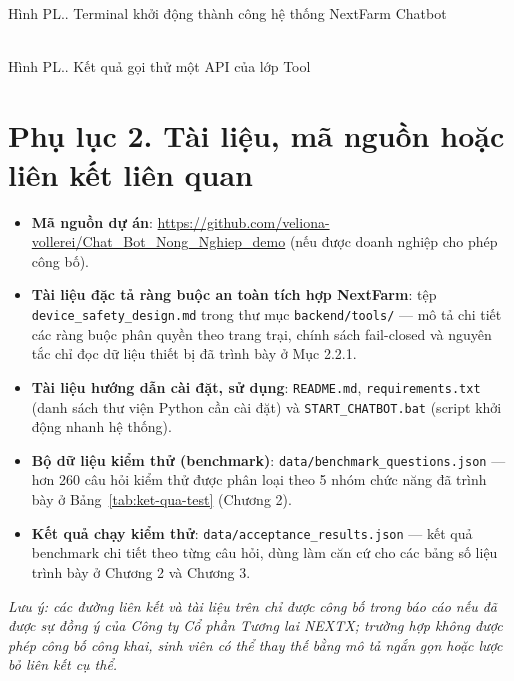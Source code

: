 \bigskip
{}
\begin{center}
    \\[4pt]
    Hình PL.\theplhinh. Terminal khởi động thành công hệ thống NextFarm Chatbot
\end{center}

\bigskip
{}
\begin{center}
    \\[4pt]
    Hình PL.\theplhinh. Kết quả gọi thử một API của lớp Tool
\end{center}

\section*{Phụ lục 2. Tài liệu, mã nguồn hoặc liên kết liên quan}

\begin{itemize}
    \item \textbf{Mã nguồn dự án}:
    \url{https://github.com/veliona-vollerei/Chat_Bot_Nong_Nghiep_demo} (nếu được
    doanh nghiệp cho phép công bố).
    \item \textbf{Tài liệu đặc tả ràng buộc an toàn tích hợp NextFarm}: tệp
    \texttt{device\_safety\_design.md} trong thư mục \texttt{backend/tools/} --- mô tả
    chi tiết các ràng buộc phân quyền theo trang trại, chính sách fail-closed và nguyên
    tắc chỉ đọc dữ liệu thiết bị đã trình bày ở Mục 2.2.1.
    \item \textbf{Tài liệu hướng dẫn cài đặt, sử dụng}: \texttt{README.md},
    \texttt{requirements.txt} (danh sách thư viện Python cần cài đặt) và
    \texttt{START\_CHATBOT.bat} (script khởi động nhanh hệ thống).
    \item \textbf{Bộ dữ liệu kiểm thử (benchmark)}:
    \texttt{data/benchmark\_questions.json} --- hơn 260 câu hỏi kiểm thử được phân
    loại theo 5 nhóm chức năng đã trình bày ở Bảng~\ref{tab:ket-qua-test} (Chương 2).
    \item \textbf{Kết quả chạy kiểm thử}: \texttt{data/acceptance\_results.json} ---
    kết quả benchmark chi tiết theo từng câu hỏi, dùng làm căn cứ cho các bảng số liệu
    trình bày ở Chương 2 và Chương 3.
\end{itemize}

\textit{Lưu ý: các đường liên kết và tài liệu trên chỉ được công bố trong báo cáo nếu
đã được sự đồng ý của Công ty Cổ phần Tương lai NEXTX; trường hợp không được phép công
bố công khai, sinh viên có thể thay thế bằng mô tả ngắn gọn hoặc lược bỏ liên kết cụ
thể.}